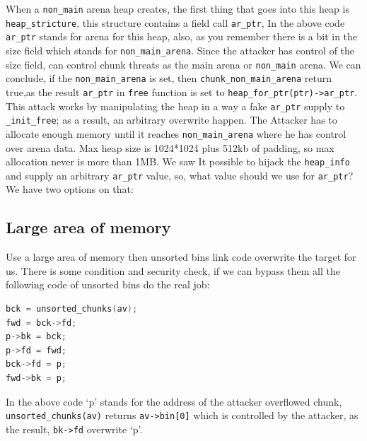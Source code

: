 \documentclass{masterthesis}
\newcommand*\ub{unsorted bins}
\newcommand*\freec{\lstinline{free}}
\begin{document}
When a \lstinline{non_main} arena heap creates, the first thing that goes into this heap is \lstinline{heap_stricture}, this structure contains a field call \lstinline{ar_ptr}, In the above code \lstinline{ar_ptr} stands for arena for this heap, also, as you remember there is a bit in the size field which stands for \lstinline{non_main_arena}. Since the attacker has control of the size field, can control chunk threats as the main arena or \lstinline{non_main} arena. We can conclude, if the \lstinline{non_main_arena} is set, then \lstinline{chunk_non_main_arena} return true,as the result \lstinline{ar_ptr} in \freec{} function is set to \lstinline{heap_for_ptr(ptr)->ar_ptr}.
This attack works by manipulating the heap in a way a fake \lstinline{ar_ptr} supply to \lstinline{_init_free}; as a result, an arbitrary overwrite happen. The Attacker has to allocate enough memory until it reaches \lstinline{non_main_arena} where he has control over arena data. Max heap size is 1024*1024 plus 512kb of padding, so max allocation never is more than 1MB.
We saw It possible to hijack the \lstinline{heap_info} and supply an arbitrary \lstinline{ar_ptr} value, so, what value should we use for \lstinline{ar_ptr}? We have two options on that:

\subsection{Large area of memory}
Use a large area of memory then \ub{} link code overwrite the target for us. There is some condition and security check, if we can bypass them all the following code of \ub{} do the real job:
\begin{lstlisting}[language=c,frame=tlrb]
bck = unsorted_chunks(av);
fwd = bck->fd;
p->bk = bck;
p->fd = fwd;
bck->fd = p;
fwd->bk = p;
\end{lstlisting}

In the above code ‘p’ stands for the address of the attacker overflowed chunk, \lstinline{unsorted_chunks(av)} returns \lstinline{av->bin[0]} which is controlled by the attacker, as the result, \lstinline{bk->fd} overwrite ‘p’.
\end{document}
